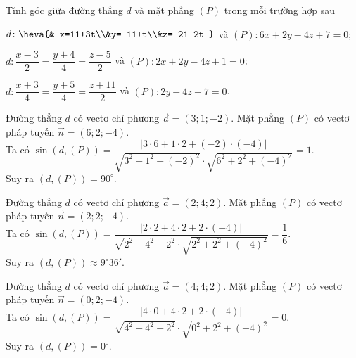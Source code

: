 \begin{bt}%
	Tính góc giữa đường thẳng $d$ và mặt phẳng $(P)$ trong mỗi trường hợp sau
	\begin{listEX}[1]
		\item $d\colon\heva{& x=11+3t\\&y=-11+t\\&z=-21-2t }$ và $(P)\colon 6x+2y-4z+7=0$;
		\item $d\colon\dfrac{x-3}{2}=\dfrac{y+4}{4}=\dfrac{z-5}{2}$ và $(P)\colon 2x+2y-4z+1=0$;
		\item $d\colon \dfrac{x+3}{4}=\dfrac{y+5}{4}=\dfrac{z+11}{2}$ và $(P)\colon 2y-4z+7=0$.
	\end{listEX}
	\loigiai
	{
		\begin{listEX}[1]
			\item Đường thẳng $d$ có vectơ chỉ phương $\overrightarrow{a}=(3;1;-2)$. Mặt phẳng $(P)$ có vectơ pháp tuyến $\overrightarrow{n}=(6;2;-4)$.\\
			Ta có $\sin (d,(P))=\dfrac{\left |3\cdot 6+1\cdot 2+(-2)\cdot (-4) \right |}{\sqrt{3^2+1^2+(-2)^2}\cdot\sqrt{6^2+2^2+(-4)^2}}=1$.\\
			Suy ra $(d,(P))=90^{\circ}$.
			\item Đường thẳng $d$ có vectơ chỉ phương $\overrightarrow{a}=(2;4;2)$. Mặt phẳng $(P)$ có vectơ pháp tuyến $\overrightarrow{n}=(2;2;-4)$.\\
			Ta có $\sin (d,(P))=\dfrac{\left |2\cdot 2+4\cdot 2+2\cdot (-4) \right |}{\sqrt{2^2+4^2+2^2}\cdot\sqrt{2^2+2^2+(-4)^2}}=\dfrac{1}{6}$.\\
			Suy ra $(d,(P))\approx 9^{\circ}36'$.
			\item Đường thẳng $d$ có vectơ chỉ phương $\overrightarrow{a}=(4;4;2)$. Mặt phẳng $(P)$ có vectơ pháp tuyến $\overrightarrow{n}=(0;2;-4)$.\\
			Ta có $\sin (d,(P))=\dfrac{\left |4\cdot 0+4\cdot 2+2\cdot (-4) \right |}{\sqrt{4^2+4^2+2^2}\cdot\sqrt{0^2+2^2+(-4)^2}}=0$.\\
			Suy ra $(d,(P))=0^{\circ}$.
		\end{listEX}
	}
\end{bt}

